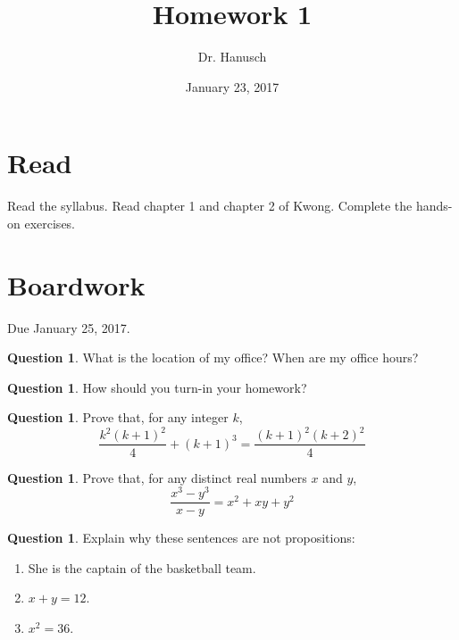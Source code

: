 \documentclass[12pt]{article}
\title{Homework 1}
\author{Dr. Hanusch}  %
\date{January 23, 2017}
\begin{document}
\newtheorem{thm}{Theorem}[section]
\newtheorem{cor}[thm]{Corollary}
\newtheorem{lem}[thm]{Lemma}
\newtheorem{prop}[thm]{Proposition}
\theoremstyle{definition}
\newtheorem{defn}[thm]{Definition}
\newtheorem{qu}[]{Question}
\theoremstyle{remark}
\newtheorem{rem}[thm]{Remark}
\newtheorem{prf}[]{Proof}

\newcommand{\norm}[1]{\left\Vert#1\right\Vert}
\newcommand{\abs}[1]{\left\vert#1\right\vert}
\newcommand{\set}[1]{\left\{#1\right\}}
\newcommand{\Real}{\mathbb R}
\newcommand{\eps}{\varepsilon}
\newcommand{\To}{\longrightarrow}
\newcommand{\BX}{\mathbf{B}(X)}
\newcommand{\A}{\mathcal{A}}



\maketitle

\section{Read}

Read the syllabus. Read chapter 1 and chapter 2 of Kwong. Complete the hands-on exercises.

\section{Boardwork} 

Due January 25, 2017.

\begin{qu} What is the location of my office? When are my office hours? \end{qu}
\begin{qu}How should you turn-in your homework? \end{qu}
\begin{qu} Prove that, for any integer $k$, $$ \frac{k^2(k+1)^2}{4} + (k+1)^3 = \frac{(k+1)^2(k+2)^2}{4}$$ \end{qu}
\begin{qu} Prove that, for any distinct real numbers $x$ and $y$, $$ \frac{x^3-y^3}{x-y}=x^2+xy+y^2$$ \end{qu}
\begin{qu} Explain why these sentences are not propositions:
\begin{enumerate}[label=\alph*)]
\item She is the captain of the basketball team.
\item $x+y=12$.
\item $x^2=36$. 
\end{enumerate} \end{qu}
\end{document}
